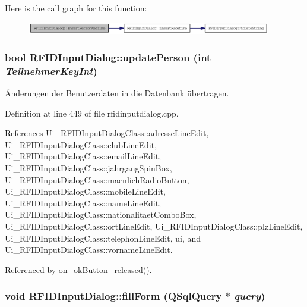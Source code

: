 Here is the call graph for this function:\nopagebreak
\begin{figure}[H]
\begin{center}
\leavevmode
\includegraphics[width=303pt]{class_r_f_i_d_input_dialog_5213121582a03ad6c9e78d1915729937_cgraph}
\end{center}
\end{figure}
\hypertarget{class_r_f_i_d_input_dialog_cfbdcec5da0cd09b10edbb23bfd9a185}{
\subsubsection[updatePerson]{\setlength{\rightskip}{0pt plus 5cm}bool RFIDInputDialog::updatePerson (int {\em TeilnehmerKeyInt})}}
\label{class_r_f_i_d_input_dialog_cfbdcec5da0cd09b10edbb23bfd9a185}


Änderungen der Benutzerdaten in die Datenbank übertragen. 



Definition at line 449 of file rfidinputdialog.cpp.

References Ui\_\-RFIDInputDialogClass::adresseLineEdit, Ui\_\-RFIDInputDialogClass::clubLineEdit, Ui\_\-RFIDInputDialogClass::emailLineEdit, Ui\_\-RFIDInputDialogClass::jahrgangSpinBox, Ui\_\-RFIDInputDialogClass::maenlichRadioButton, Ui\_\-RFIDInputDialogClass::mobileLineEdit, Ui\_\-RFIDInputDialogClass::nameLineEdit, Ui\_\-RFIDInputDialogClass::nationalitaetComboBox, Ui\_\-RFIDInputDialogClass::ortLineEdit, Ui\_\-RFIDInputDialogClass::plzLineEdit, Ui\_\-RFIDInputDialogClass::telephonLineEdit, ui, and Ui\_\-RFIDInputDialogClass::vornameLineEdit.

Referenced by on\_\-okButton\_\-released().\hypertarget{class_r_f_i_d_input_dialog_7ed5355f398c29b79d81c4a4cd7b7c11}{
\subsubsection[fillForm]{\setlength{\rightskip}{0pt plus 5cm}void RFIDInputDialog::fillForm (QSqlQuery $\ast$ {\em query})}}
\label{class_r_f_i_d_input_dialog_7ed5355f398c29b79d81c4a4cd7b7c11}



